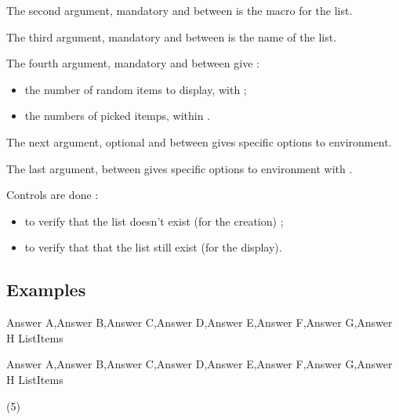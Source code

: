 \documentclass[english,11pt,a4paper]{article}
\begin{document}
The second argument, mandatory and between  is the macro for the list.

The third argument, mandatory and between  is the name of the list.

The fourth argument, mandatory and between  give :

\begin{itemize}
	\item the number of random items to display, with  ;
	\item the numbers of picked itemps, within .
\end{itemize}

The next argument, optional and between  gives specific options to  environment.

The last argument, between  gives specific options to  environment with .

\medskip

Controls are done :

\begin{itemize}
	\item to verify that the list doesn't exist (for the creation) ;
	\item to verify that that the list still exist (for the display).
\end{itemize}

\subsection{Examples}

\begin{codehigh}[language=latex/latex3,style/main=teal!25,style/code=teal!25]
\CreateItemsList%
    {Answer A,Answer B,Answer C,Answer D,Answer E,Answer F,Answer G,Answer H}%
    {\mylistofitems}{ListItems}
\end{codehigh}

\CreateItemsList%
{Answer A,Answer B,Answer C,Answer D,Answer E,Answer F,Answer G,Answer H}%
{\mylistofitems}{ListItems}

\begin{demohigh}[language=latex/latex3,style/main=teal!25,style/code=teal!25]
(5)
\end{demohigh}
\end{document}
